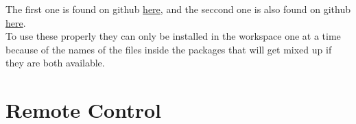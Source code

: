 \documentclass[12pt,letterpaper,oneside]{article}
\begin{document}
The first one is found on github \href{https://github.com/gnuoyohes/roboclaw_ros}{here}, and the seccond one is also found on github \href{https://github.com/csvance/roboclaw}{here}.\\
To use these properly they can only be installed in the workspace one at a time because of the names of the files inside the packages that will get mixed up if they are both available.


\section{Remote Control}

\printbibliography
\end{document}
